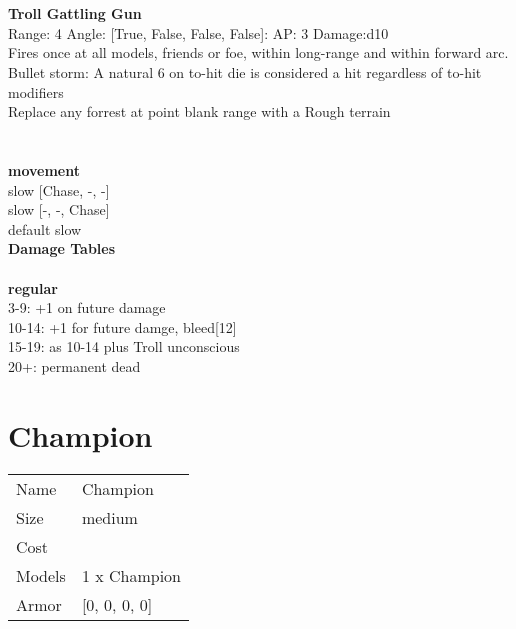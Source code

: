 \ \\

\ \\
{\bf Troll Gattling Gun } \\



Range: 4  Angle: [True, False, False, False]: AP: 3 Damage:d10 \\
Fires once at all models, friends or foe, within long-range and within forward arc.\\ 
Bullet storm: A natural 6 on to-hit die is considered a hit regardless of to-hit modifiers\\ 
Replace any forrest at point blank range with a Rough terrain\\ 




 
\ \\



\ \\ {\bf movement } \\
slow [Chase, -, -] \\
slow [-, -, Chase] \\
default slow \\


{\bf Damage Tables} \\
\ \\ {\bf regular } \\
3-9: +1 on future damage \\
10-14: +1 for future damge, bleed[12] \\
15-19: as 10-14 plus Troll unconscious \\
20+: permanent dead \\










\pagebreak\pagebreak

\section{ Champion }

\begin{tabular}{ll}
  Name & Champion \\
  Size & medium\\
  Cost & \\
  Models & 1 x Champion\\
  Armor & [0, 0, 0, 0]\\
\end{tabular}

